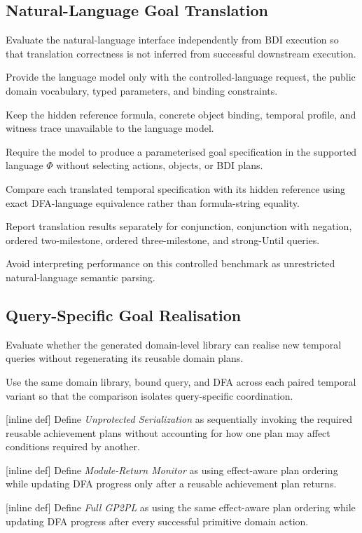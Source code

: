 \subsection{Natural-Language Goal Translation}

Evaluate the natural-language interface independently from BDI execution so that translation correctness is not inferred from successful downstream execution.

Provide the language model only with the controlled-language request, the public domain vocabulary, typed parameters, and binding constraints.

Keep the hidden reference formula, concrete object binding, temporal profile, and witness trace unavailable to the language model.

Require the model to produce a parameterised goal specification in the supported language \(\Phi\) without selecting actions, objects, or BDI plans.

Compare each translated temporal specification with its hidden reference using exact DFA-language equivalence rather than formula-string equality.

Report translation results separately for conjunction, conjunction with negation, ordered two-milestone, ordered three-milestone, and strong-Until queries.

Avoid interpreting performance on this controlled benchmark as unrestricted natural-language semantic parsing.


\subsection{Query-Specific Goal Realisation}

Evaluate whether the generated domain-level library can realise new temporal queries without regenerating its reusable domain plans.

Use the same domain library, bound query, and DFA across each paired temporal variant so that the comparison isolates query-specific coordination.

[inline def] Define \emph{Unprotected Serialization} as sequentially invoking the required reusable achievement plans without accounting for how one plan may affect conditions required by another.

[inline def] Define \emph{Module-Return Monitor} as using effect-aware plan ordering while updating DFA progress only after a reusable achievement plan returns.

[inline def] Define \emph{Full GP2PL} as using the same effect-aware plan ordering while updating DFA progress after every successful primitive domain action.

